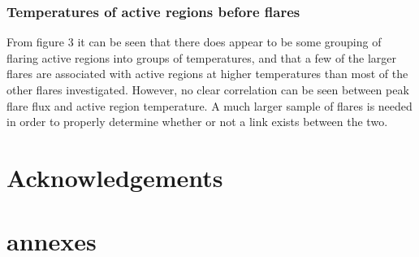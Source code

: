 \documentclass{article}
\begin{document}
\subsubsection{Temperatures of active regions before flares}
From figure 3 it can be seen that there does appear to be some grouping of flaring active regions into groups of temperatures, and that a few of the larger flares are associated with active regions at higher temperatures than most of the other flares investigated.
However, no clear correlation can be seen between peak flare flux and active region temperature.
A much larger sample of flares is needed in order to properly determine whether or not a link exists between the two.

\section*{Acknowledgements}

\section*{annexes}



\end{document}
